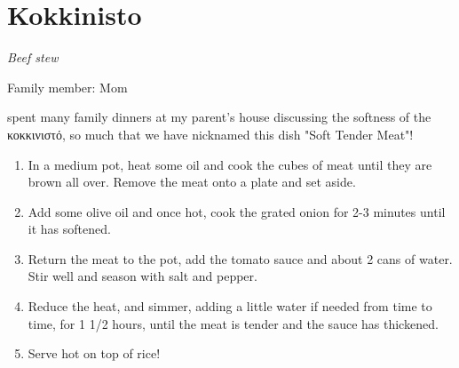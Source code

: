 \chapter{Kokkinisto}
\label{ch:kokkinisto}


\textit{Beef stew}

Family member: Mom

 spent many family dinners at my parent's house discussing the softness of the \textgreek{κοκκινιστό}, so much that we have nicknamed this dish "Soft Tender Meat"!

\begin{enumerate}
    \item In a medium pot, heat some oil and cook the cubes of meat until they are brown all over. Remove the meat onto a plate and set aside.
    \item Add some olive oil and once hot, cook the grated onion for 2-3 minutes until it has softened.
    \item Return the meat to the pot, add the tomato sauce and about 2 cans of water. Stir well and season with salt and pepper.
    \item Reduce the heat, and simmer, adding a little water if needed from time to time, for 1 1/2 hours, until the meat is tender and the sauce has thickened.
    \item Serve hot on top of rice!
\end{enumerate}

